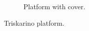 \begin{figure}[h]
\begin{subfigure}[c]{0.3\textwidth}
	\caption{Platform with cover.}
	\label{fig:triskar-cover}
	\end{subfigure}
	\caption{Triskarino platform.}
	\label{fig:robot}
\end{figure} 